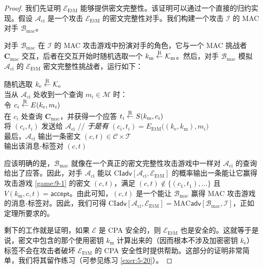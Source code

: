 \begin{proof}
我们先证明 $\mathcal{E}_\mathrm{EtM}$ 能够提供密文完整性。该证明可以通过一个直接的归约实现。假设 $\mathcal{A}_\mathrm{ci}$ 是一个攻击 $\mathcal{E}_\mathrm{EtM}$ 的密文完整性对手。我们构建一个攻击 $\mathcal{I}$ 的 MAC 对手 $\mathcal{B}_\mathrm{mac}$。

对手 $\mathcal{B}_\mathrm{mac}$ 在 $\mathcal{I}$ 的 MAC 攻击游戏中扮演对手的角色，它与一个 MAC 挑战者 $\mathbf{C}_\mathrm{mac}$ 交互，后者在交互开始时随机选取一个 $k_\mathrm{m}\overset{\rm R}\leftarrow\mathcal{K}_\mathrm{m}$。然后，对手 $\mathcal{B}_\mathrm{mac}$ 模拟 $\mathcal{A}_\mathrm{ci}$ 的 $\mathcal{E}_\mathrm{EtM}$ 密文完整性挑战者，运行如下：

\vspace*{10pt}

\hspace*{5pt} 随机选取 $k_\mathrm{e}\overset{\rm R}\leftarrow\mathcal{K}_\mathrm{e}$\\
\hspace*{26pt} 当从 $\mathcal{A}_\mathrm{ci}$ 处收到一个查询 $m_i\in\mathcal{M}$ 时：\\
\hspace*{50pt} 令 $c_i\overset{\rm R}\leftarrow E(k_\mathrm{e},m_i)$\\
\hspace*{50pt} 在 $c_i$ 处查询 $\mathbf{C}_\mathrm{mac}$，并获得一个应答 $t_i\overset{\rm R}\leftarrow S(k_\mathrm{m},c_i)$\\
\hspace*{50pt} 将 $(c_i,t_i)$ 发送给 $\mathcal{A}_\mathrm{ci}$
\hspace*{10pt} // \quad \emph{于是有} $(c_i,t_i)=E_\mathrm{EtM}\big((k_\mathrm{e},k_\mathrm{m}),m_i\big)$\\
\hspace*{26pt} 最后，$\mathcal{A}_\mathrm{ci}$ 输出一条密文 $(c,t)\in\mathcal{C}\times\mathcal{T}$\\
\hspace*{26pt} 输出该消息-标签对 $(c,t)$

\vspace*{10pt}

\noindent
应该明确的是，$\mathcal{B}_\mathrm{mac}$ 就像在一个真正的密文完整性攻击游戏中一样对 $\mathcal{A}_\mathrm{ci}$ 的查询给出了应答。因此，对手 $\mathcal{A}_\mathrm{ci}$ 能以 $\mathrm{CI}\mathsf{adv}[\mathcal{A}_\mathrm{ci},\mathcal{E}_\mathrm{EtM}]$ 的概率输出一条能让它赢得攻击游戏 \ref{game:9-1} 的密文 $(c,t)$，满足 $(c,t)\notin\{(c_1,t_1),\dots\}$ 且 $V(k_\mathrm{m},c,t)=\mathsf{accept}$。由此可知，$(c,t)$ 是一个能让 $\mathcal{B}_\mathrm{mac}$ 赢得 MAC 攻击游戏的消息-标签对。因此，我们可得 $\mathrm{CI}\mathsf{adv}[\mathcal{A}_\mathrm{ci},\mathcal{E}_\mathrm{EtM}]=\mathrm{MAC}\mathsf{adv}[\mathcal{B}_\mathrm{mac},\mathcal{I}]$，正如定理所要求的。

剩下的工作就是证明，如果 $\mathcal{E}$ 是 CPA 安全的，则 $\mathcal{E}_\mathrm{EtM}$ 也是安全的。这就等于是说，密文中包含的那个使用密钥 $k_\mathrm{m}$ 计算出来的（因而根本不涉及加密密钥 $k_\mathrm{e}$）标签不会在攻击者破坏 $\mathcal{E}_\mathrm{EtM}$ 的 CPA 安全性时提供帮助。这部分的证明非常简单，我们将其留作练习（可参见练习 \ref{exer:5-20}）。
\end{proof}

